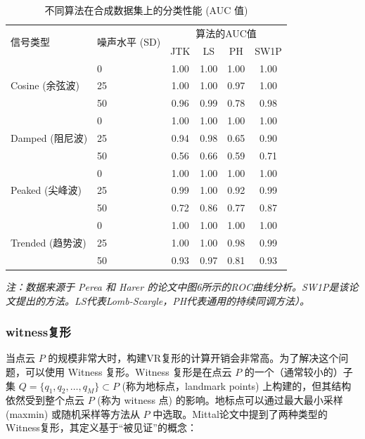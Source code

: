 \begin{table}[htbp]
    \centering
    \caption{不同算法在合成数据集上的分类性能 (AUC 值)}
    \label{tab:auc_results}
    \begin{tabular}{@{}llcccc@{}}
    \toprule
    \multirow{2}{*}{信号类型} & \multirow{2}{*}{噪声水平 (SD)} & \multicolumn{4}{c}{算法的AUC值} \\
    \cmidrule(l){3-6}
     &  & JTK & LS & PH & SW1P \\
    \midrule
    \multirow{3}{*}{Cosine (余弦波)} & 0  & 1.00 & 1.00 & 1.00 & 1.00 \\
                                   & 25 & 1.00 & 1.00 & 0.97 & 1.00 \\
                                   & 50 & 0.96 & 0.99 & 0.78 & 0.98 \\
    \midrule
    \multirow{3}{*}{Damped (阻尼波)} & 0  & 1.00 & 1.00 & 1.00 & 1.00 \\
                                   & 25 & 0.94 & 0.98 & 0.65 & 0.90 \\
                                   & 50 & 0.56 & 0.66 & 0.59 & 0.71 \\
    \midrule
    \multirow{3}{*}{Peaked (尖峰波)} & 0  & 1.00 & 1.00 & 1.00 & 1.00 \\
                                   & 25 & 0.99 & 1.00 & 0.92 & 0.99 \\
                                   & 50 & 0.72 & 0.86 & 0.77 & 0.87 \\
    \midrule
    \multirow{3}{*}{Trended (趋势波)} & 0  & 1.00 & 1.00 & 1.00 & 1.00 \\
                                    & 25 & 1.00 & 1.00 & 0.98 & 0.99 \\
                                    & 50 & 0.93 & 0.97 & 0.81 & 0.93 \\
    \bottomrule
    \end{tabular}
    \footnotesize
    \newline
    \textit{注：数据来源于 Perea 和 Harer 的论文中图6所示的ROC曲线分析。SW1P是该论文提出的方法。LS代表Lomb-Scargle，PH代表通用的持续同调方法）。}
    \end{table}


\subsubsection{witness复形}
当点云 $P$ 的规模非常大时，构建VR复形的计算开销会非常高。为了解决这个问题，可以使用 Witness 复形\cite{de2004topological}。Witness 复形是在点云 $P$ 的一个（通常较小的）子集 $Q = \{q_1, q_2, \ldots, q_M\} \subset P$ (称为地标点，landmark points) 上构建的，但其结构依然受到整个点云 $P$ (称为 witness 点) 的影响。地标点可以通过最大最小采样 (maxmin) 或随机采样等方法从 $P$ 中选取。Mittal\cite{mittal2017topological}论文中提到了两种类型的Witness复形，其定义基于“被见证”的概念：

